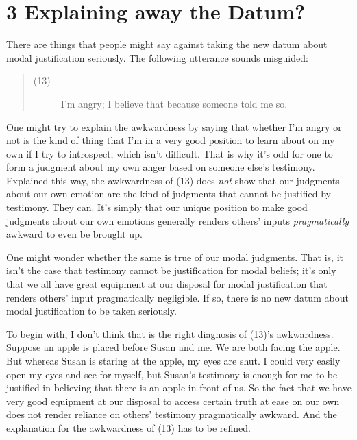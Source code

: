 \documentclass[a4paper,12pt]{article}
\begin{document}
\section*{3 Explaining away the Datum?}
There are things that people might say against taking the new datum about modal justification seriously. The following utterance sounds misguided:

\begin{quote}
\begin{description}
\item[(13)] I'm angry; I believe that because someone told me so.
\end{description}
\end{quote}

One might try to explain the awkwardness by saying that whether I'm angry or not is the kind of thing that I'm in a very good position to learn about on my own if I try to introspect, which isn't difficult. That is why it's odd for one to form a judgment about my own anger based on someone else's testimony. Explained this way, the awkwardness of (13) does \emph{not} show that our judgments about our own emotion are the kind of judgments that cannot be justified by testimony. They can. It's simply that our unique position to make good judgments about our own emotions generally renders others' inputs \emph{pragmatically} awkward to even be brought up.

One might wonder whether the same is true of our modal judgments. That is, it isn't the case that testimony cannot be justification for modal beliefs; it's only that we all have great equipment at our disposal for modal justification that renders others' input pragmatically negligible. If so, there is no new datum about modal justification to be taken seriously.

To begin with, I don't think that is the right diagnosis of (13)'s awkwardness. Suppose an apple is placed before Susan and me. We are both facing the apple. But whereas Susan is staring at the apple, my eyes are shut. I could very easily open my eyes and see for myself, but Susan's testimony is enough for me to be justified in believing that there is an apple in front of us. So the fact that we have very good equipment at our disposal to access certain truth at ease on our own does not render reliance on others' testimony pragmatically awkward. And the explanation for the awkwardness of (13) has to be refined.
\end{document}
